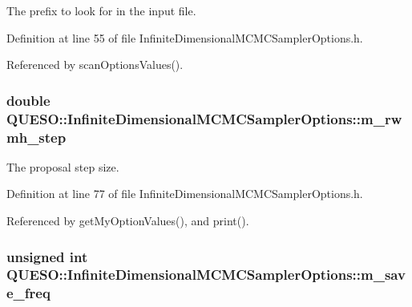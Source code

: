 The prefix to look for in the input file. 



Definition at line 55 of file Infinite\-Dimensional\-M\-C\-M\-C\-Sampler\-Options.\-h.



Referenced by scan\-Options\-Values().

\hypertarget{class_q_u_e_s_o_1_1_infinite_dimensional_m_c_m_c_sampler_options_a08b73ed8aa86a07c5ed02394380d0434}{
\subsubsection[{m\-\_\-rwmh\-\_\-step}]{\setlength{\rightskip}{0pt plus 5cm}double Q\-U\-E\-S\-O\-::\-Infinite\-Dimensional\-M\-C\-M\-C\-Sampler\-Options\-::m\-\_\-rwmh\-\_\-step}}\label{class_q_u_e_s_o_1_1_infinite_dimensional_m_c_m_c_sampler_options_a08b73ed8aa86a07c5ed02394380d0434}


The proposal step size. 



Definition at line 77 of file Infinite\-Dimensional\-M\-C\-M\-C\-Sampler\-Options.\-h.



Referenced by get\-My\-Option\-Values(), and print().

\hypertarget{class_q_u_e_s_o_1_1_infinite_dimensional_m_c_m_c_sampler_options_aa477dfa39894194aecbc064e2d11af56}{
\subsubsection[{m\-\_\-save\-\_\-freq}]{\setlength{\rightskip}{0pt plus 5cm}unsigned int Q\-U\-E\-S\-O\-::\-Infinite\-Dimensional\-M\-C\-M\-C\-Sampler\-Options\-::m\-\_\-save\-\_\-freq}}\label{class_q_u_e_s_o_1_1_infinite_dimensional_m_c_m_c_sampler_options_aa477dfa39894194aecbc064e2d11af56}


